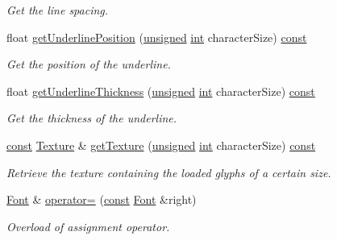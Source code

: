 \begin{DoxyCompactItemize}
\begin{DoxyCompactList}\small\item\em Get the line spacing. \end{DoxyCompactList}\item 
float \hyperlink{classsf_1_1_font_a9b21290b1b8bbf75232f64bdd7a994da}{get\-Underline\-Position} (\hyperlink{curses_8priv_8h_aca40206900cfc164654362fa8d4ad1e6}{unsigned} \hyperlink{term__entry_8h_ad65b480f8c8270356b45a9890f6499ae}{int} character\-Size) \hyperlink{term__entry_8h_a57bd63ce7f9a353488880e3de6692d5a}{const} 
\begin{DoxyCompactList}\small\item\em Get the position of the underline. \end{DoxyCompactList}\item 
float \hyperlink{classsf_1_1_font_a17fd6090e585a76f1f7b7f658ea70ee1}{get\-Underline\-Thickness} (\hyperlink{curses_8priv_8h_aca40206900cfc164654362fa8d4ad1e6}{unsigned} \hyperlink{term__entry_8h_ad65b480f8c8270356b45a9890f6499ae}{int} character\-Size) \hyperlink{term__entry_8h_a57bd63ce7f9a353488880e3de6692d5a}{const} 
\begin{DoxyCompactList}\small\item\em Get the thickness of the underline. \end{DoxyCompactList}\item 
\hyperlink{term__entry_8h_a57bd63ce7f9a353488880e3de6692d5a}{const} \hyperlink{classsf_1_1_texture}{Texture} \& \hyperlink{classsf_1_1_font_a887368a4e6a3dfa32dea89d2af315951}{get\-Texture} (\hyperlink{curses_8priv_8h_aca40206900cfc164654362fa8d4ad1e6}{unsigned} \hyperlink{term__entry_8h_ad65b480f8c8270356b45a9890f6499ae}{int} character\-Size) \hyperlink{term__entry_8h_a57bd63ce7f9a353488880e3de6692d5a}{const} 
\begin{DoxyCompactList}\small\item\em Retrieve the texture containing the loaded glyphs of a certain size. \end{DoxyCompactList}\item 
\hyperlink{classsf_1_1_font}{Font} \& \hyperlink{classsf_1_1_font_a232515549846e3172a514d0b47918399}{operator=} (\hyperlink{term__entry_8h_a57bd63ce7f9a353488880e3de6692d5a}{const} \hyperlink{classsf_1_1_font}{Font} \&right)
\begin{DoxyCompactList}\small\item\em Overload of assignment operator. \end{DoxyCompactList}\item 

\end{DoxyCompactItemize}
